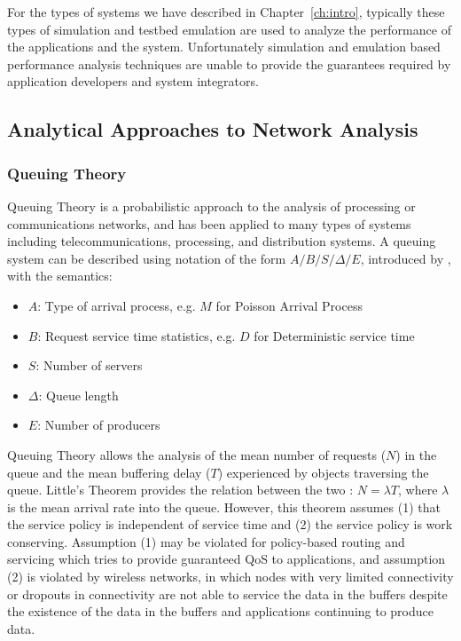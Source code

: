 For the types of systems we have described in Chapter~\ref{ch:intro},
typically these types of simulation and testbed emulation are used to
analyze the performance of the applications and the system.
Unfortunately simulation and emulation based performance analysis
techniques are unable to provide the guarantees required by
application developers and system integrators.

\subsection{Analytical Approaches to Network Analysis}
\label{subsec:related_part1_analytics}

\subsubsection{Queuing Theory}
Queuing Theory\cite{QT_Kendall1953}\cite{QT_Giambene2005} is a
probabilistic approach to the analysis of processing or communications
networks, and has been applied to many types of systems including
telecommunications, processing, and distribution systems.  A queuing
system can be described using notation of the form $A/B/S/\Delta/E$,
introduced by \cite{QT_Kendall1953}, with the semantics:

\begin{itemize}
\item $A$: Type of arrival process, e.g. $M$ for Poisson Arrival Process
\item $B$: Request service time statistics, e.g. $D$ for Deterministic service time
\item $S$: Number of servers
\item $\Delta$: Queue length
\item $E$: Number of producers
\end{itemize}

Queuing Theory allows the analysis of the mean number of requests
($N$) in the queue and the mean buffering delay ($T$) experienced by
objects traversing the queue.  Little's Theorem provides the relation
between the two : $N=\lambda T$\cite{littleTheorem}, where $\lambda$
is the mean arrival rate into the queue.  However, this theorem
assumes (1) that the service policy is independent of service time and
(2) the service policy is work conserving.  Assumption (1) may be
violated for policy-based routing and servicing which tries to provide
guaranteed QoS to applications, and assumption (2) is violated by
wireless networks, in which nodes with very limited connectivity or
dropouts in connectivity are not able to service the data in the
buffers despite the existence of the data in the buffers and
applications continuing to produce data.

